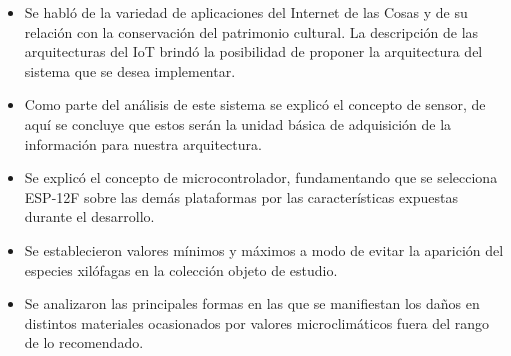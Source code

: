     \begin{itemize}
        \item Se habló de la variedad de aplicaciones del Internet de las Cosas y de su relación con la conservación del patrimonio cultural. La descripción de las arquitecturas del IoT brindó la posibilidad de proponer la arquitectura del sistema que se desea implementar.
        \item Como parte del análisis de este sistema se explicó el concepto de sensor, de aquí se concluye que estos serán la unidad básica de adquisición de la información para nuestra arquitectura.
        \item Se explicó el concepto de microcontrolador, fundamentando que se selecciona ESP-12F sobre las demás plataformas por las características expuestas durante el desarrollo.
        \item Se establecieron valores mínimos y máximos a modo de evitar la aparición del especies xilófagas en la colección objeto de estudio.
        \item Se analizaron las principales formas en las que se manifiestan los daños en distintos materiales ocasionados por valores microclimáticos fuera del rango de lo recomendado. 
    \end{itemize}